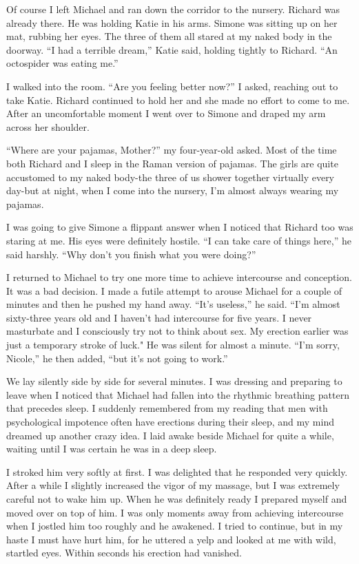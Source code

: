 \documentclass[]{article}
\begin{document}
Of course I left Michael and ran down the corridor to the nursery.  Richard was already there.  He was holding Katie in his arms.  Simone was sitting up on her mat, rubbing her eyes.  The three of them all stared at my naked body in the doorway.  “I had a terrible dream,” Katie said, holding tightly to Richard.  “An octospider was eating me.”

I walked into the room.  “Are you feeling better now?” I asked, reaching out to take Katie.  Richard continued to hold her and she made no effort to come to me.  After an uncomfortable moment I went over to Simone and draped my arm across her shoulder.

“Where are your pajamas, Mother?” my four-year-old asked.  Most of the time both Richard and I sleep in the Raman version of pajamas.  The girls are quite accustomed to my naked body-the three of us shower together virtually every day-but at night, when I come into the nursery, I’m almost always wearing my pajamas.

I was going to give Simone a flippant answer when I noticed that Richard too was staring at me.  His eyes were definitely hostile.  “I can take care of things here,” he said harshly.  “Why don’t you finish what you were doing?”

I returned to Michael to try one more time to achieve intercourse and conception.  It was a bad decision.  I made a futile attempt to arouse Michael for a couple of minutes and then he pushed my hand away.  “It’s useless,” he said.  “I’m almost sixty-three years old and I haven’t had intercourse for five years.  I never masturbate and I consciously try not to think about sex.  My erection earlier was just a temporary stroke of luck."  He was silent for almost a minute.  “I’m sorry, Nicole,” he then added, “but it’s not going to work.”

We lay silently side by side for several minutes.  I was dressing and preparing to leave when I noticed that Michael had fallen into the rhythmic breathing pattern that precedes sleep.  I suddenly remembered from my reading that men with psychological impotence often have erections during their sleep, and my mind dreamed up another crazy idea.  I laid awake beside Michael for quite a while, waiting until I was certain he was in a deep sleep.

I stroked him very softly at first.  I was delighted that he responded very quickly.  After a while I slightly increased the vigor of my massage, but I was extremely careful not to wake him up.  When he was definitely ready I prepared myself and moved over on top of him.  I was only moments away from achieving intercourse when I jostled him too roughly and he awakened.  I tried to continue, but in my haste I must have hurt him, for he uttered a yelp and looked at me with wild, startled eyes.  Within seconds his erection had vanished.
\end{document}
